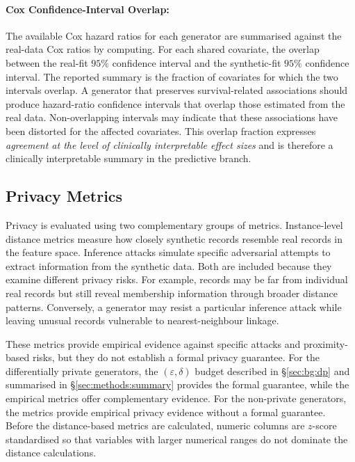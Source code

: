 \paragraph{Cox Confidence-Interval Overlap:}
\label{sec:eval:utility:predictive:cox-overlap}
The available Cox hazard ratios for each generator are summarised
against the real-data Cox ratios by computing. For each shared covariate,
the overlap between the real-fit $95\%$ confidence interval and the
synthetic-fit $95\%$ confidence interval. The reported summary is
the fraction of covariates for which the two intervals overlap. 
A generator that preserves survival-related associations should produce
hazard-ratio confidence intervals that overlap those estimated from the
real data. Non-overlapping intervals may indicate that these associations
have been distorted for the affected covariates. This
overlap fraction expresses \emph{agreement at the level of clinically
interpretable effect sizes} and is therefore a clinically interpretable
summary in the predictive branch.

\subsection{Privacy Metrics}
\label{sec:eval:privacy}

Privacy is evaluated using two complementary groups of metrics.
Instance-level distance metrics measure how closely synthetic records
resemble real records in the feature space. Inference attacks simulate
specific adversarial attempts to extract information from the synthetic
data. Both are included because they examine different privacy risks.
For example, records may be far from individual real records but still
reveal membership information through broader distance patterns.
Conversely, a generator may resist a particular inference attack while
leaving unusual records vulnerable to nearest-neighbour linkage.

These metrics provide empirical evidence against specific attacks and
proximity-based risks, but they do not establish a formal privacy
guarantee. For the differentially private generators, the
$(\varepsilon,\delta)$ budget described in \S\ref{sec:bg:dp} and
summarised in \S\ref{sec:methods:summary} provides the formal guarantee,
while the empirical metrics offer complementary evidence. For the
non-private generators, the metrics provide empirical privacy evidence
without a formal guarantee. Before the distance-based metrics are
calculated, numeric columns are $z$-score standardised so that variables
with larger numerical ranges do not dominate the distance calculations.

